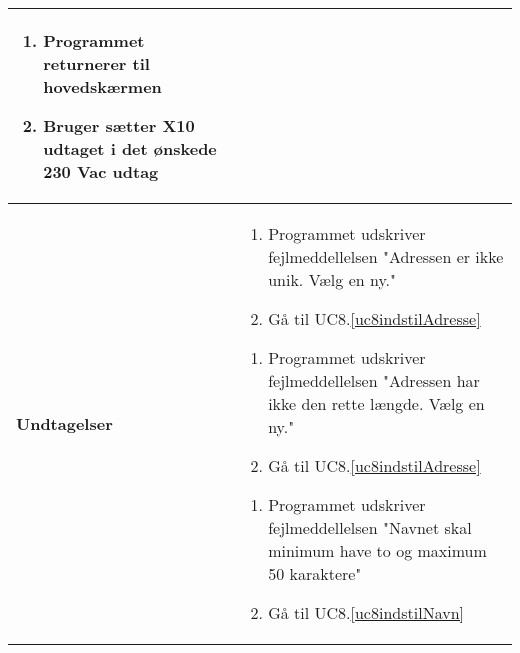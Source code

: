 \begin{table}[H]
\begin{tabular}{|p{6cm}|p{8cm}|}
\begin{enumerate}
				\item Programmet returnerer til hovedskærmen
				
				\item Bruger sætter X10 udtaget i det ønskede 230 Vac udtag
																																	
			\end{enumerate}\\\hline
		
		\textbf{Undtagelser}					
		&\begin{enumerate}[label= \ref{uc8adresse}a.\arabic*.]
			\item Programmet udskriver fejlmeddellelsen "Adressen er ikke unik. Vælg en ny."
			
			\item Gå til UC8.\ref{uc8indstilAdresse}
		\end{enumerate}
		
	
		
		\begin{enumerate}[label= \ref{uc8adresse}b.\arabic*.]
			\item Programmet udskriver fejlmeddellelsen "Adressen har ikke den rette længde. Vælg en ny."
			
			\item Gå til UC8.\ref{uc8indstilAdresse}
		\end{enumerate}
		
		
		
		\begin{enumerate}[label= \ref{uc8navn}a.\arabic*.]
			\item Programmet udskriver fejlmeddellelsen "Navnet skal minimum have to og maximum 50 karaktere"
			
			\item Gå til UC8.\ref{uc8indstilNavn}
		\end{enumerate} \\ \hline
											

	\end{tabular}
	\label{UC8} 
\end{table}
